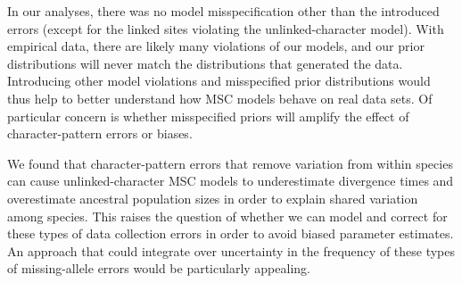 In our analyses, there was no model misspecification other than the introduced
errors (except for the linked sites violating the unlinked-character model).
With empirical data, there are likely many violations of our models,
and our prior distributions will never match the distributions that generated
the data.
Introducing other model violations and misspecified prior distributions
would thus help to better understand how MSC models behave on real
data sets.
Of particular concern is whether misspecified priors will amplify the effect of
character-pattern errors or biases.

We found that character-pattern errors that remove variation from within
species can cause unlinked-character MSC models to underestimate divergence
times and overestimate ancestral population sizes in order to explain shared
variation among species.
This raises the question of whether we can model and correct for these types of
data collection errors in order to avoid biased parameter estimates.
An approach that could integrate over uncertainty in the frequency of these
types of missing-allele errors would be particularly appealing.




